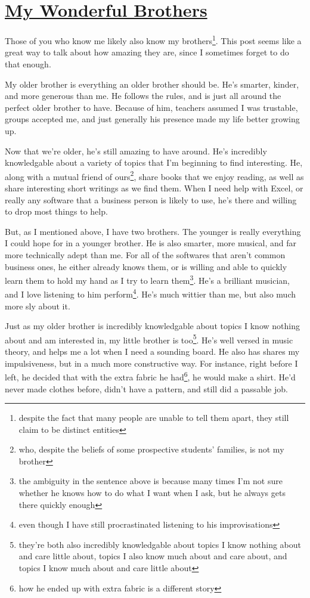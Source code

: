\documentclass[12pt]{article}[titlepage]
\newcommand{\1}{\={a}}
\newcommand{\2}{\={e}}
\newcommand{\3}{\={\i}}
\newcommand{\4}{\=o}
\newcommand{\5}{\=u}
\newcommand{\6}{\={A}}
\renewcommand{\,}{\textsuperscript{,}}
\begin{document}
\doublespacing

\section{\href{my-wonderful-brothers.html}{My Wonderful Brothers}}

Those of you who know me likely also know my brothers\footnote{despite the fact that many people are unable to tell them apart, they still claim to be distinct entities}. This post seems like a great way to talk about how amazing they are, since I sometimes forget to do that enough.

My older brother is everything an older brother should be. He's smarter, kinder, and more generous than me. He follows the rules, and is just all around the perfect older brother to have. Because of him, teachers assumed I was trustable, groups accepted me, and just generally his presence made my life better growing up.

Now that we're older, he's still amazing to have around. He's incredibly knowledgable about a variety of topics that I'm beginning to find interesting. He, along with a mutual friend of ours\footnote{ who, despite the beliefs of some prospective students' families, is not my brother}, share books that we enjoy reading, as well as share interesting short writings as we find them. When I need help with Excel, or really any software that a business person is likely to use, he's there and willing to drop most things to help.

But, as I mentioned above, I have two brothers. The younger is really everything I could hope for in a younger brother. He is also smarter, more musical, and far more technically adept than me. For all of the softwares that aren't common business ones, he either already knows them, or is willing and able to quickly learn them to hold my hand as I try to learn them\footnote{the ambiguity in the sentence above is because many times I'm not sure whether he knows how to do what I want when I ask, but he always gets there quickly enough}. He's a brilliant musician, and I love listening to him perform\footnote{even though I have still procrastinated listening to his improvisations}. He's much wittier than me, but also much more sly about it.

Just as my older brother is incredibly knowledgable about topics I know nothing about and am interested in, my little brother is too\footnote{they're both also incredibly knowledgable about topics I know nothing about and care little about, topics I also know much about and care about, and topics I know much about and care little about}. He's well versed in music theory, and helps me a lot when I need a sounding board. He also has shares my impulsiveness, but in a much more constructive way. For instance, right before I left, he decided that with the extra fabric he had\footnote{how he ended up with extra fabric is a different story}, he would make a shirt. He'd never made clothes before, didn't have a pattern, and still did a passable job.
\end{document}
